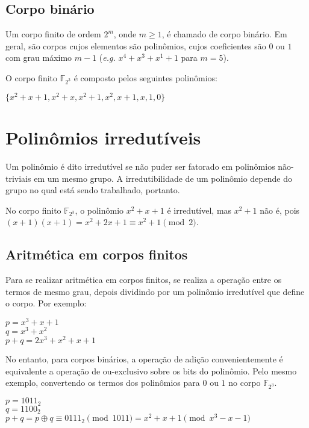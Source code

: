 \documentclass[12pt]{article}
\begin{document}
\subsection{Corpo binário}

Um corpo finito de ordem $2^{m}$, onde $m \geq 1$, é chamado de corpo binário.
Em geral, são corpos cujos elementos são polinômios, cujos coeficientes são $0$
ou $1$ com grau máximo $m-1$ (\textit{e.g.} $x^{4} + x^{3} + x^{1} + 1$ para
$m = 5$).

O corpo finito $\mathbb{F}_{2^{3}}$ é composto pelos seguintes polinômios:

\begin{center}
    $\{x^{2}+x+1, x^{2}+x, x^{2}+1, x^{2}, x+1, x, 1, 0\}$
\end{center}

\section{Polinômios irredutíveis}

Um polinômio é dito irredutível se não puder ser fatorado em polinômios
não-triviais em um mesmo grupo. A irredutibilidade de um polinômio depende do
grupo no qual está sendo trabalhado, portanto.

No corpo finito $\mathbb{F}_{2^{3}}$, o polinômio $x^{2}+x+1$ é irredutível,
mas $x^{2}+1$ não é, pois $(x+1)(x+1) = x^{2}+2x+1 \equiv x^{2}+1 \pmod{2}$.

\subsection{Aritmética em corpos finitos}

Para se realizar aritmética em corpos finitos, se realiza a operação entre os
termos de mesmo grau, depois dividindo por um polinômio irredutível que define
o corpo. Por exemplo:

\begin{center}
    $p = x^{3}+x+1$ \\
    $q = x^{3}+x^{2}$ \\
    $p+q = 2x^{3}+x^{2}+x+1$
\end{center}

No entanto, para corpos binários, a operação de adição convenientemente é
equivalente a operação de ou-exclusivo sobre os bits do polinômio. Pelo mesmo
exemplo, convertendo os termos dos polinômios para $0$ ou $1$ no corpo
$\mathbb{F}_{2^{3}}$.

\begin{center}
    $p = {1011}_2$ \\
    $q = {1100}_2$ \\
    $p+q = p \oplus q \equiv {0111}_2 \pmod{1011} = x^{2}+x+1 \pmod{x^{3}-x-1}$
\end{center}
\end{document}
